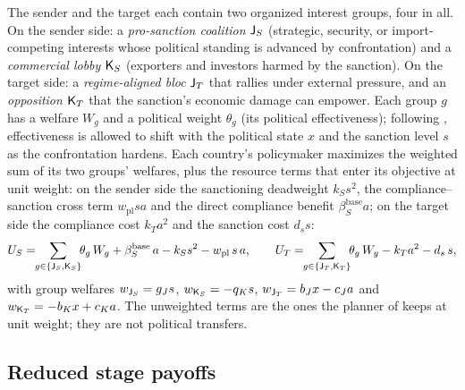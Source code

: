 The sender and the target each contain two organized interest groups,
four in all. On the sender side: a \emph{pro-sanction coalition}
$\mathsf{J}_S$ (strategic, security, or import-competing interests whose
political standing is advanced by confrontation) and a \emph{commercial
lobby} $\mathsf{K}_S$ (exporters and investors harmed by the sanction). On the
target side: a \emph{regime-aligned bloc} $\mathsf{J}_T$ that rallies under
external pressure, and an \emph{opposition} $\mathsf{K}_T$ that the sanction's
economic damage can empower. Each group $g$ has a welfare $W_g$ and a
political weight $\theta_g$ (its political effectiveness); following \citet{Kaempfer1988},
effectiveness is allowed to shift with the political state $x$ and the
sanction level $s$ as the confrontation hardens. Each country's
policymaker maximizes the \citet[eq.~(11)]{GrossmanHelpman1994}
weighted sum of its two groups' welfares, plus the resource terms that enter
its objective at unit weight: on the sender side the sanctioning
deadweight $k_Ss^2$, the compliance--sanction cross term $w_{\mathrm{pl}}sa$ and the direct
compliance benefit $\beta^{\mathrm{base}}_Sa$; on the target side the
compliance cost $k_Ta^2$ and the sanction cost $d_ss$:
\begin{equation}
\Us=\!\!\sum_{g\in\{\JSgroup,\KSgroup\}}\!\!\theta_g\,W_g
+\beta^{\mathrm{base}}_S\,a-k_Ss^2-w_{\mathrm{pl}}\,s\,a,
\qquad
\Ut=\!\!\sum_{g\in\{\JTgroup,\KTgroup\}}\!\!\theta_g\,W_g
-k_Ta^2-d_s\,s ,
\label{eq:GH-aggregate}
\end{equation}
with group welfares $w_{\mathsf{J}_S}=g_Js$, $w_{\mathsf{K}_S}=-q_Ks$,
$w_{\mathsf{J}_T}=b_Jx-c_Ja$ and $w_{\mathsf{K}_T}=-b_Kx+c_Ka$. The unweighted terms
are the ones the planner of  keeps at unit
weight; they are not political transfers.

\subsection{Reduced stage payoffs}
\label{sec:fourgroup:payoffs}

